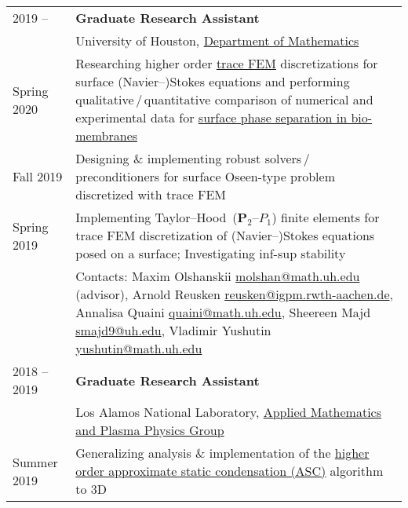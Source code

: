 \documentclass[a4paper,12pt]{article}
\begin{document}
	\begin{longtable}{ l >{\raggedright\arraybackslash}p{15cm} }
		2019 --
			& \textbf{Graduate Research Assistant}\vspace{1mm}\\
			& University of Houston, \href{http://www.uh.edu/nsm/math/}{Department of Mathematics}\vspace{1mm}\\
		Spring 2020
			& Researching higher order  \href{https://www.math.uh.edu/~molshan/tracefinite.html}{trace FEM} discretizations for surface (Navier--)Stokes equations and performing qualitative\,/\,quantitative comparison of numerical and experimental data for \href{https://www.math.uh.edu/~molshan/material.html}{surface phase separation in bio-membranes}\vspace{1mm}\\
		Fall 2019
			& Designing \& implementing robust solvers\,/\,preconditioners for surface Oseen-type problem discretized with trace FEM\vspace{1mm}\\
		Spring 2019
			& Implementing Taylor--Hood~($\mathbf{P}_2$--$P_1$) finite elements for trace FEM discretization of (Navier--)Stokes equations posed on a surface; Investigating inf-sup stability\vspace{1mm}\\
			& Contacts: Maxim Olshanskii \href{mailto:molshan@math.uh.edu}{molshan@math.uh.edu} (advisor), Arnold Reusken \href{mailto:reusken@igpm.rwth-aachen.de}{reusken@igpm.rwth-aachen.de}, Annalisa Quaini \href{mailto:quaini@math.uh.edu}{quaini@math.uh.edu}, Sheereen Majd \href{mailto:smajd9@uh.edu}{smajd9@uh.edu}, Vladimir Yushutin \href{mailto:yushutin@math.uh.edu}{yushutin@math.uh.edu}\vspace{3mm}\\
		2018 -- 2019
			& \textbf{Graduate Research Assistant}\vspace{1mm}\\
			& Los Alamos National Laboratory, \href{http://www.lanl.gov/org/padste/adtsc/theoretical/applied-mathematics-plasma-physics}{Applied Mathematics and Plasma Physics Group}\vspace{1mm}\\
		Summer 2019
			& Generalizing analysis \& implementation of the \href{https://www.researchgate.net/publication/330912268_A_higher_order_approximate_static_condensation_method_for_multi-material_diffusion_problems}{higher order approximate static condensation (ASC)} algorithm to 3D\vspace{1mm}\\

\end{longtable}
\end{document}
